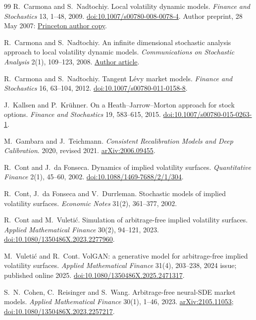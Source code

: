 \documentclass[11pt,a4paper]{article}
\numberwithin{equation}{section}
\theoremstyle{definition}\newtheorem{definition}[theorem]{Definition}
\theoremstyle{remark}\newtheorem{remark}[theorem]{Remark}
\begin{document}
\begin{thebibliography}{99}
R.~Carmona and S.~Nadtochiy. Local volatility dynamic models.
\emph{Finance and Stochastics} 13, 1--48, 2009.
\href{https://doi.org/10.1007/s00780-008-0078-4}{doi:10.1007/s00780-008-0078-4}.
Author preprint, 28 May 2007:
\href{https://carmona.scholar.princeton.edu/document/246}{Princeton author copy}.

R.~Carmona and S.~Nadtochiy.
An infinite dimensional stochastic analysis approach to local volatility dynamic models.
\emph{Communications on Stochastic Analysis} 2(1), 109--123, 2008.
\href{https://repository.lsu.edu/cosa/vol2/iss1/8/}{Author article}.

R.~Carmona and S.~Nadtochiy. Tangent L\'evy market models.
\emph{Finance and Stochastics} 16, 63--104, 2012.
\href{https://doi.org/10.1007/s00780-011-0158-8}{doi:10.1007/s00780-011-0158-8}.

J.~Kallsen and P.~Kr\"uhner. On a Heath--Jarrow--Morton approach for stock options.
\emph{Finance and Stochastics} 19, 583--615, 2015.
\href{https://doi.org/10.1007/s00780-015-0263-1}{doi:10.1007/s00780-015-0263-1}.

M.~Gambara and J.~Teichmann.
\emph{Consistent Recalibration Models and Deep Calibration}.
2020, revised 2021. \href{https://arxiv.org/abs/2006.09455}{arXiv:2006.09455}.

R.~Cont and J.~da Fonseca. Dynamics of implied volatility surfaces.
\emph{Quantitative Finance} 2(1), 45--60, 2002.
\href{https://doi.org/10.1088/1469-7688/2/1/304}{doi:10.1088/1469-7688/2/1/304}.

R.~Cont, J.~da Fonseca and V.~Durrleman.
Stochastic models of implied volatility surfaces.
\emph{Economic Notes} 31(2), 361--377, 2002.

R.~Cont and M.~Vuleti\'c. Simulation of arbitrage-free implied volatility surfaces.
\emph{Applied Mathematical Finance} 30(2), 94--121, 2023.
\href{https://doi.org/10.1080/1350486X.2023.2277960}{doi:10.1080/1350486X.2023.2277960}.

M.~Vuleti\'c and R.~Cont. VolGAN: a generative model for arbitrage-free implied volatility surfaces.
\emph{Applied Mathematical Finance} 31(4), 203--238, 2024 issue; published online 2025.
\href{https://doi.org/10.1080/1350486X.2025.2471317}{doi:10.1080/1350486X.2025.2471317}.

S.~N.~Cohen, C.~Reisinger and S.~Wang. Arbitrage-free neural-SDE market models.
\emph{Applied Mathematical Finance} 30(1), 1--46, 2023.
\href{https://arxiv.org/abs/2105.11053}{arXiv:2105.11053};
\href{https://doi.org/10.1080/1350486X.2023.2257217}{doi:10.1080/1350486X.2023.2257217}.


\end{thebibliography}
\end{document}
